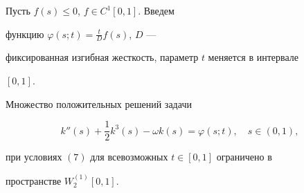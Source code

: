 \begin{lem}


Пусть $f(s) \le 0$, $f \in C^1[0,1]$. Введем


функцию $\varphi (s;t)=\frac{t}{D} f(s)$, $D$ ---


фиксированная изгибная жесткость, параметр $t$ меняется в интервале


$[0,1]$.





Множество положительных решений задачи


\begin{equation}


{k}''(s) + \frac{1}{2} k^3 (s)-\omega k(s)=\varphi (s;t),\quad s\in (0,1),


\end{equation}


при условиях $(7)$ для всевозможных $t \in [0,1]$ ограничено в


пространстве $W_2^{(1)}[0,1]$.


\end{lem}





